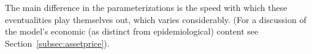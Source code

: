 The main difference in the parameterizations is the speed with which these eventualities play themselves out, which varies considerably.  (For a discussion of the model's economic (as distinct from epidemiological) content see Section~\ref{subsec:assetprice}).



